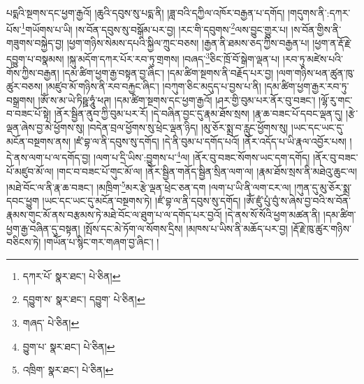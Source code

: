 པདྨའི་སྔགས་དང་ཕྱག་རྒྱའོ། །ཆུའི་དབུས་སུ་པདྨ་ནི། །ཟླ་བའི་དཀྱིལ་འཁོར་བརྒྱན་པ་དགོད། །གདུགས་ནི་:དཀར་པོས་\footnote{དཀར་པོ་  སྣར་ཐང་།  པེ་ཅིན། }གཡོགས་པ་ཡི། །ས་བོན་དབུས་སུ་བསྒོམ་པར་བྱ། །རང་གི་དབུགས་\footnote{དབྱུག་ས་  སྣར་ཐང་། དབྱུག་  པེ་ཅིན། }ལས་བྱུང་གྱུར་པ། །ས་བོན་གྱིས་ནི་གཟུགས་བསྐྱེད་བྱ། །ཕྱག་གཉིས་སེམས་དཔའི་སྐྱིལ་ཀྲུང་བཅས། །རྒྱན་ནི་ཐམས་ཅད་ཀྱིས་བརྒྱན་པ། །ཕྱག་ན་རྡོ་རྗེ་དབྱུག་པ་བསྣམས། །སྐུ་མདོག་དཀར་པོར་རབ་ཏུ་གྲགས། །བཞད་\footnote{གཞད་  པེ་ཅིན། }ཅིང་ཁྲོ་བོ་སྒེག་ལྡན་པ། །རབ་ཏུ་མཛེས་པའི་གོས་ཀྱིས་བརྒྱན། །དམ་ཚིག་ཕྱག་རྒྱ་བསྟན་བྱ་ཞིང་། །དམ་ཚིག་སྔགས་ནི་བརྗོད་པར་བྱ། །ལག་གཉིས་ཕན་ཚུན་ཁུ་ཚུར་བཅས། །མཛུབ་མོ་གཉིས་ནི་རབ་བརྐྱང་ཞིང་། །བཀུག་ཅིང་མདུད་པ་བྱས་པ་ནི། །དམ་ཚིག་ཕྱག་རྒྱར་རབ་ཏུ་བསྒྲགས། །ཨོཾ་ས་མ་ཡེ་ཏིཥྛ་ཧཱུཾ་ཕཊ། །དམ་ཚིག་སྔགས་དང་ཕྱག་རྒྱའོ། །ཤར་གྱི་བུམ་པར་ནོར་བུ་བཟང་། །ལྷོ་རུ་གང་བ་བཟང་པོ་སྟེ། །ནོར་སྦྱིན་ནུབ་ཀྱི་བུམ་པར་རོ། །དེ་བཞིན་བྱང་དུ་རྣམ་ཐོས་སྲས། །རྣ་ཆ་བཟང་པོ་དབང་ལྡན་དུ། །རྩེ་ལྡན་ཞེས་བྱ་མེ་ཕྱོགས་སུ། །བདེན་བྲལ་ཕྱོགས་སུ་ཕྲེང་ལྡན་ཉིད། །མུ་ཅོར་སྨྲ་བ་རླུང་ཕྱོགས་སུ། །ཡང་དང་ཡང་དུ་མངོན་བསྔགས་ནས། །ཛཾ་བྷ་ལ་ནི་དབུས་སུ་དགོད། །དེ་ནི་བུམ་པ་དགོད་པའོ། །ནོར་འདོད་པ་ཡི་རྣལ་འབྱོར་པས། །དེ་ནས་ལག་པ་ལ་དགོད་བྱ། །ལག་པ་དྲི་ཡིས་:བྱུགས་པ་\footnote{བྱུག་པ་  སྣར་ཐང་།  པེ་ཅིན། }ལ། །ནོར་བུ་བཟང་སོགས་ཡང་དག་དགོད། །ནོར་བུ་བཟང་པོ་མཛུབ་མོ་ལ། །གང་བ་བཟང་པོ་གུང་མོ་ལ། །ནོར་སྦྱིན་གནོད་སྦྱིན་སྲིན་ལག་ལ། །རྣམ་ཐོས་སྲས་ནི་མཐེའུ་ཆུང་ལ། །མཐེ་བོང་ལ་ནི་རྣ་ཆ་བཟང་། །མཁྲིག་\footnote{འཁྲིག་  སྣར་ཐང་།  པེ་ཅིན། }མར་རྩེ་ལྡན་ཕྲེང་ཅན་དག །ལག་པ་ཡི་ནི་ལག་ངར་ལ། །ཀུན་དུ་མུ་ཅོར་སྨྲ་དབང་ཕྱུག །ཡང་དང་ཡང་དུ་མངོན་བསྔགས་ཏེ། །ཛཾ་བྷ་ལ་ནི་དབུས་སུ་དགོད། །ཨོཾ་ཛུཾ་པུཾ་བུཾ་ས་ཞེས་བྱ་བའི་ས་བོན་རྣམས་གུང་མོ་ནས་བརྩམས་ཏེ་མཐེ་བོང་ལ་ཐུག་པ་ལ་དགོད་པར་བྱའོ། །དེ་ནས་སོ་སོའི་ཕྱག་མཚན་ནི། །དམ་ཚིག་ཕྱག་རྒྱ་བཞིན་དུ་བསྟན། །སྤོས་དང་མེ་ཏོག་ལ་སོགས་དྲིས། །མཁས་པ་ཡིས་ནི་མཆོད་པར་བྱ། །རྡོ་རྗེ་ཁུ་ཚུར་གཉིས་བཅིངས་ཏེ། །གཡོན་པ་སྙིང་གར་གཞག་བྱ་ཞིང་། །
